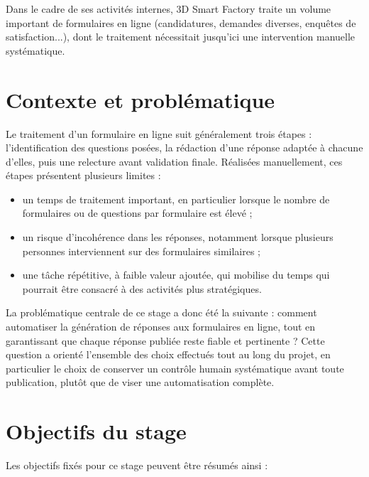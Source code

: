 \documentclass[12pt,a4paper]{report}
\begin{document}
Dans le cadre de ses activités internes, 3D Smart Factory traite un volume
important de formulaires en ligne (candidatures, demandes diverses,
enquêtes de satisfaction...), dont le traitement nécessitait jusqu'ici une
intervention manuelle systématique.

\section{Contexte et problématique}

Le traitement d'un formulaire en ligne suit généralement trois étapes :
l'identification des questions posées, la rédaction d'une réponse adaptée à
chacune d'elles, puis une relecture avant validation finale. Réalisées
manuellement, ces étapes présentent plusieurs limites :

\begin{itemize}
    \item un temps de traitement important, en particulier lorsque le
    nombre de formulaires ou de questions par formulaire est élevé ;
    \item un risque d'incohérence dans les réponses, notamment lorsque
    plusieurs personnes interviennent sur des formulaires similaires ;
    \item une tâche répétitive, à faible valeur ajoutée, qui mobilise du
    temps qui pourrait être consacré à des activités plus stratégiques.
\end{itemize}

La problématique centrale de ce stage a donc été la suivante : comment
automatiser la génération de réponses aux formulaires en ligne, tout en
garantissant que chaque réponse publiée reste fiable et pertinente ? Cette
question a orienté l'ensemble des choix effectués tout au long du projet,
en particulier le choix de conserver un contrôle humain systématique avant
toute publication, plutôt que de viser une automatisation complète.

\section{Objectifs du stage}

Les objectifs fixés pour ce stage peuvent être résumés ainsi :
\end{document}
